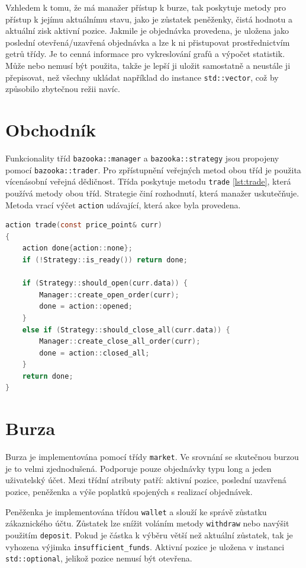 Vzhledem k tomu, že má manažer přístup k burze, tak poskytuje metody pro přístup k jejímu aktuálnímu stavu, jako je zůstatek peněženky, čistá hodnotu a aktuální zisk aktivní pozice.
Jakmile je objednávka provedena, je uložena jako poslední otevřená/uzavřená objednávka a lze k ni přistupovat prostřednictvím getrů třídy.
Je to cenná informace pro vykreslování grafů a výpočet statistik.
Může nebo nemusí být použita, takže je lepší ji uložit samostatně a neustále ji přepisovat, než všechny ukládat například do instance \texttt{std::vector}, což by způsobilo zbytečnou režii navíc.

\section{Obchodník}
Funkcionality tříd \texttt{bazooka::manager} a \texttt{bazooka::strategy} jsou propojeny pomocí \texttt{bazooka::trader}.
Pro zpřístupnění veřejných metod obou tříd je použita vícenásobní veřejná dědičnost.
Třída poskytuje metodu \texttt{trade} \ref{lst:trade}, která používá metody obou tříd.
Strategie činí rozhodnutí, která manažer uskutečňuje.
Metoda vrací výčet \texttt{action} udávající, která akce byla provedena.

\begin{lstlisting}[caption={~Implementace metody trade třídy \texttt{bazooka::trader}},label={lst:trade},captionpos=t,abovecaptionskip=-\medskipamount,belowcaptionskip=\medskipamount,language=C]
action trade(const price_point& curr)
{
    action done{action::none};
    if (!Strategy::is_ready()) return done;

    if (Strategy::should_open(curr.data)) {
        Manager::create_open_order(curr);
        done = action::opened;
    }
    else if (Strategy::should_close_all(curr.data)) {
        Manager::create_close_all_order(curr);
        done = action::closed_all;
    }
    return done;
}
\end{lstlisting}

\section{Burza}
Burza je implementována pomocí třídy \texttt{market}.
Ve srovnání se skutečnou burzou je to velmi zjednodušená.
Podporuje pouze objednávky typu long a jeden uživatelský účet.
Mezi třídní atributy patří: aktivní pozice, poslední uzavřená pozice, peněženka a výše poplatků spojených s realizací objednávek.

Peněženka je implementována třídou \texttt{wallet} a slouží ke správě zůstatku zákaznického účtu.
Zůstatek lze snížit voláním metody \texttt{withdraw} nebo navýšit použitím \texttt{deposit}.
Pokud je částka k výběru větší než aktuální zůstatek, tak je vyhozena výjimka \texttt{insufficient\_funds}.
Aktivní pozice je uložena v instanci \texttt{std::optional}, jelikož pozice nemusí být otevřena.

